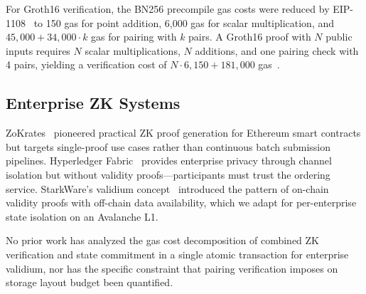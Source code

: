 For Groth16 verification, the BN256 precompile gas costs were reduced by EIP-1108~\cite{eip1108}
to 150 gas for point addition, 6,000 gas for scalar multiplication, and $45{,}000 + 34{,}000
\cdot k$ gas for pairing with $k$ pairs. A Groth16 proof with $N$ public inputs requires
$N$ scalar multiplications, $N$ additions, and one pairing check with 4 pairs, yielding a
verification cost of $N \cdot 6{,}150 + 181{,}000$ gas~\cite{groth2016size}.

\subsection{Enterprise ZK Systems}

ZoKrates~\cite{eberhardt2018private} pioneered practical ZK proof generation for Ethereum
smart contracts but targets single-proof use cases rather than continuous batch submission
pipelines. Hyperledger Fabric~\cite{hyperledger2024fabric} provides enterprise privacy
through channel isolation but without validity proofs---participants must trust the ordering
service. StarkWare's validium concept~\cite{starkware2024validium} introduced the pattern
of on-chain validity proofs with off-chain data availability, which we adapt for
per-enterprise state isolation on an Avalanche L1.

No prior work has analyzed the gas cost decomposition of combined ZK verification and state
commitment in a single atomic transaction for enterprise validium, nor has the specific
constraint that pairing verification imposes on storage layout budget been quantified.
